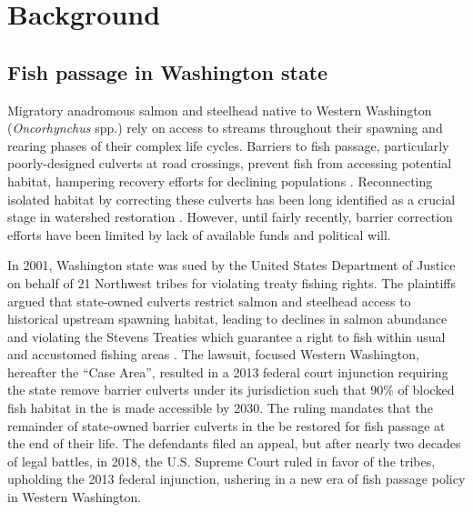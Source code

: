 \documentclass[12pt]{elsarticle}
\begin{document}
%
\section{Background}

\subsection*{Fish passage in Washington state}



Migratory anadromous salmon and steelhead native to Western Washington (\textit{Oncorhynchus} spp.) rely on access to streams throughout their spawning and rearing phases of their complex life cycles. Barriers to fish passage, particularly poorly-designed culverts at road crossings, prevent fish from accessing potential habitat, hampering recovery efforts for declining populations \citep{noauthor_2020_2020}. Reconnecting isolated habitat by correcting these culverts has been long identified as a crucial stage in watershed restoration \citep{roni_review_2002}. However, until fairly recently, barrier correction efforts have been limited by lack of available funds and political will. 


In 2001, Washington state was sued by the United States Department of Justice on behalf of 21 Northwest tribes for violating treaty fishing rights. The plaintiffs argued that state-owned culverts restrict salmon and steelhead access to historical upstream spawning habitat, leading to declines in salmon abundance and violating the Stevens Treaties which guarantee a right to fish within usual and accustomed fishing areas \citep{hickey_highway_2018}. The lawsuit, focused Western Washington, hereafter the ``Case Area'', resulted in a 2013 federal court injunction requiring the state remove barrier culverts under its jurisdiction such that 90\% of blocked fish habitat in the is made accessible by 2030. The ruling mandates that the remainder of state-owned barrier culverts in the be restored for fish passage at the end of their life. The defendants filed an appeal, but after nearly two decades of legal battles, in 2018, the U.S. Supreme Court ruled in favor of the tribes, upholding the 2013 federal injunction, ushering in a new era of fish passage policy in Western Washington. 
\end{document}
